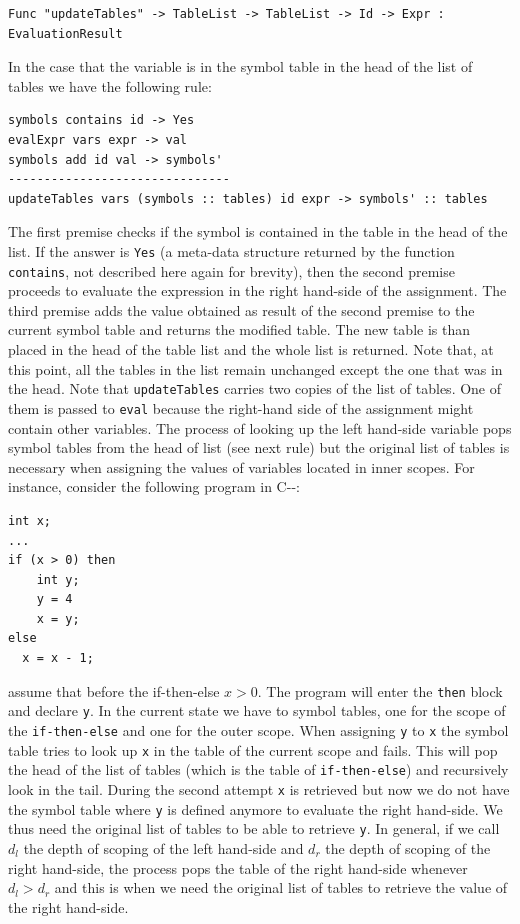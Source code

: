 \begin{lstlisting}
Func "updateTables" -> TableList -> TableList -> Id -> Expr : EvaluationResult
\end{lstlisting}

\noindent
In the case that the variable is in the symbol table in the head of the list of tables we have the following rule:

\begin{lstlisting}
symbols contains id -> Yes
evalExpr vars expr -> val
symbols add id val -> symbols'
-------------------------------
updateTables vars (symbols :: tables) id expr -> symbols' :: tables
\end{lstlisting}

\noindent
The first premise checks if the symbol is contained in the table in the head of the list. If the answer is \texttt{Yes} (a meta-data structure returned by the function \texttt{contains}, not described here again for brevity), then the second premise proceeds to evaluate the expression in the right hand-side of the assignment. The third premise adds the value obtained as result of the second premise to the current symbol table and returns the modified table. The new table is than placed in the head of the table list and the whole list is returned. Note that, at this point, all the tables in the list remain unchanged except the one that was in the head. Note that \texttt{updateTables} carries two copies of the list of tables. One of them is passed to \texttt{eval} because the right-hand side of the assignment might contain other variables. The process of looking up the left hand-side variable pops symbol tables from the head of list (see next rule) but the original list of tables is necessary when assigning the values of variables located in inner scopes. For instance, consider the following program in C-{}-:

\begin{lstlisting}[caption = C-{}- sample program, label = code:ch_mcnv_languages_c--_sample_program]
int x;
...
if (x > 0) then
	int y;
	y = 4
	x = y;
else
  x = x - 1;	
\end{lstlisting}

\noindent
assume that before the if-then-else $x > 0$. The program will enter the \texttt{then} block and declare \texttt{y}. In the current state we have to symbol tables, one for the scope of the \texttt{if-then-else} and one for the outer scope. When assigning \texttt{y} to \texttt{x} the symbol table tries to look up \texttt{x} in the table of the current scope and fails. This will pop the head of the list of tables (which is the table of \texttt{if-then-else}) and recursively look in the tail. During the second attempt \texttt{x} is retrieved but now we do not have the symbol table where \texttt{y} is defined anymore to evaluate the right hand-side. We thus need the original list of tables to be able to retrieve \texttt{y}. In general, if we call \texttt{$d_l$} the depth of scoping of the left hand-side and $d_r$ the depth of scoping of the right hand-side, the process pops the table of the right hand-side whenever $d_l > d_r$ and this is when we need the original list of tables to retrieve the value of the right hand-side.

